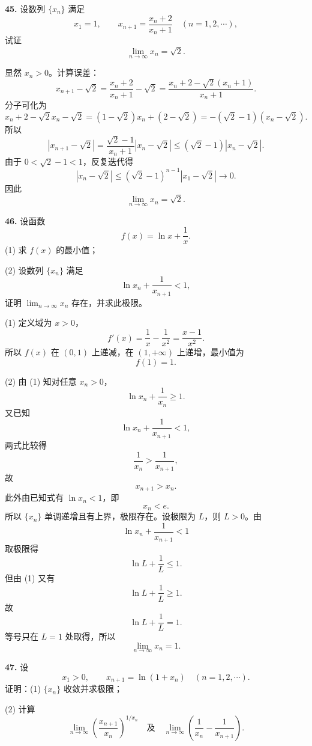 \begin{problemblock}
\textbf{45.} 设数列 \(\{x_n\}\) 满足
\[
x_1=1,\qquad x_{n+1}=\frac{x_n+2}{x_n+1}\quad(n=1,2,\cdots),
\]
试证
\[
\lim_{n\to\infty}x_n=\sqrt2.
\]
\end{problemblock}

\begin{solutionblock}
显然 \(x_n>0\)。计算误差：
\[
x_{n+1}-\sqrt2
=\frac{x_n+2}{x_n+1}-\sqrt2
=\frac{x_n+2-\sqrt2(x_n+1)}{x_n+1}.
\]
分子可化为
\[
x_n+2-\sqrt2x_n-\sqrt2
=(1-\sqrt2)x_n+(2-\sqrt2)
=-(\sqrt2-1)(x_n-\sqrt2).
\]
所以
\[
|x_{n+1}-\sqrt2|
=\frac{\sqrt2-1}{x_n+1}|x_n-\sqrt2|
\le(\sqrt2-1)|x_n-\sqrt2|.
\]
由于 \(0<\sqrt2-1<1\)，反复迭代得
\[
|x_n-\sqrt2|\le(\sqrt2-1)^{n-1}|x_1-\sqrt2|\to0.
\]
因此
\[
\lim_{n\to\infty}x_n=\sqrt2.
\]
\end{solutionblock}

\begin{problemblock}
\textbf{46.} 设函数
\[
f(x)=\ln x+\frac1x.
\]
(1) 求 \(f(x)\) 的最小值；

(2) 设数列 \(\{x_n\}\) 满足
\[
\ln x_n+\frac1{x_{n+1}}<1,
\]
证明 \(\lim_{n\to\infty}x_n\) 存在，并求此极限。
\end{problemblock}

\begin{solutionblock}
(1) 定义域为 \(x>0\)，
\[
f'(x)=\frac1x-\frac1{x^2}=\frac{x-1}{x^2}.
\]
所以 \(f(x)\) 在 \((0,1)\) 上递减，在 \((1,+\infty)\) 上递增，最小值为
\[
f(1)=1.
\]

(2) 由 (1) 知对任意 \(x_n>0\)，
\[
\ln x_n+\frac1{x_n}\ge1.
\]
又已知
\[
\ln x_n+\frac1{x_{n+1}}<1,
\]
两式比较得
\[
\frac1{x_n}>\frac1{x_{n+1}},
\]
故
\[
x_{n+1}>x_n.
\]
此外由已知式有 \(\ln x_n<1\)，即
\[
x_n<e.
\]
所以 \(\{x_n\}\) 单调递增且有上界，极限存在。设极限为 \(L\)，则 \(L>0\)。由
\[
\ln x_n+\frac1{x_{n+1}}<1
\]
取极限得
\[
\ln L+\frac1L\le1.
\]
但由 (1) 又有
\[
\ln L+\frac1L\ge1.
\]
故
\[
\ln L+\frac1L=1.
\]
等号只在 \(L=1\) 处取得，所以
\[
\lim_{n\to\infty}x_n=1.
\]
\end{solutionblock}

\begin{problemblock}
\textbf{47.} 设
\[
x_1>0,\qquad x_{n+1}=\ln(1+x_n)\quad(n=1,2,\cdots).
\]
证明：(1) \(\{x_n\}\) 收敛并求极限；

(2) 计算
\[
\lim_{n\to\infty}\left(\frac{x_{n+1}}{x_n}\right)^{1/x_n}
\quad\text{及}\quad
\lim_{n\to\infty}\left(\frac1{x_n}-\frac1{x_{n+1}}\right).
\]
\end{problemblock}

